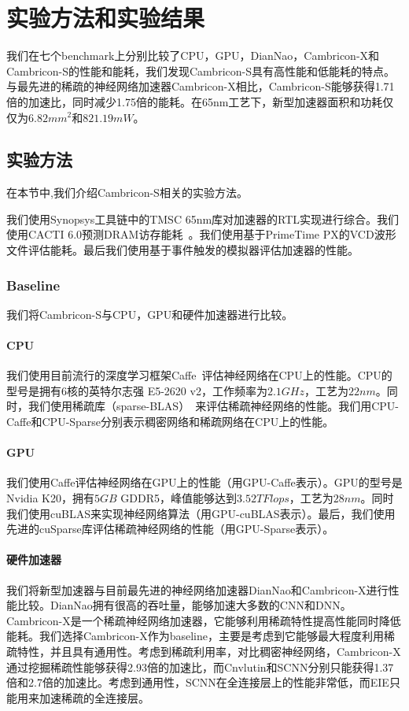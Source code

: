 \chapter{实验方法和实验结果}

我们在七个benchmark上分别比较了CPU，GPU，DianNao，Cambricon-X和Cambricon-S的性能和能耗，我们发现Cambricon-S具有高性能和低能耗的特点。与最先进的稀疏的神经网络加速器Cambricon-X相比，Cambricon-S能够获得1.71倍的加速比，同时减少1.75倍的能耗。在65nm工艺下，新型加速器面积和功耗仅仅为$6.82mm^2$和$821.19mW$。

\section{实验方法}
在本节中,我们介绍Cambricon-S相关的实验方法。

我们使用Synopsys工具链中的TMSC 65nm库对加速器的RTL实现进行综合。我们使用CACTI 6.0预测DRAM访存能耗~\cite{muralimanohar2007optimizing}。我们使用基于PrimeTime PX的VCD波形文件评估能耗。最后我们使用基于事件触发的模拟器评估加速器的性能。

\subsection{Baseline}
我们将Cambricon-S与CPU，GPU和硬件加速器进行比较。

\subsubsection{CPU}
我们使用目前流行的深度学习框架Caffe~\cite{jia2014caffe}评估神经网络在CPU上的性能。CPU的型号是拥有6核的英特尔志强 E5-2620 v2，工作频率为$2.1GHz$，工艺为$22nm$。同时，我们使用稀疏库（sparse-BLAS）~\cite{duff2002overview}来评估稀疏神经网络的性能。我们用CPU-Caffe和CPU-Sparse分别表示稠密网络和稀疏网络在CPU上的性能。

\subsubsection{GPU}
我们使用Caffe评估神经网络在GPU上的性能（用GPU-Caffe表示）。GPU的型号是Nvidia K20，拥有$5GB$ GDDR5，峰值能够达到$3.52TFlops$，工艺为$28nm$。同时我们使用cuBLAS来实现神经网络算法（用GPU-cuBLAS表示）。最后，我们使用先进的cuSparse库评估稀疏神经网络的性能（用GPU-Sparse表示）。

\subsubsection{硬件加速器}
我们将新型加速器与目前最先进的神经网络加速器DianNao和Cambricon-X进行性能比较。DianNao拥有很高的吞吐量，能够加速大多数的CNN和DNN。Cambricon-X是一个稀疏神经网络加速器，它能够利用稀疏特性提高性能同时降低能耗。我们选择Cambricon-X作为baseline，主要是考虑到它能够最大程度利用稀疏特性，并且具有通用性。考虑到稀疏利用率，对比稠密神经网络，Cambricon-X通过挖掘稀疏性能够获得2.93倍的加速比，而Cnvlutin和SCNN分别只能获得1.37倍和2.7倍的加速比。考虑到通用性，SCNN在全连接层上的性能非常低，而EIE只能用来加速稀疏的全连接层。

